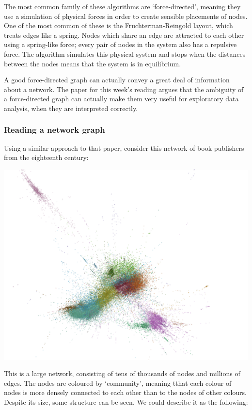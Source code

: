 \documentclass[
]{book}
\begin{document}
The most common family of these algorithms are `force-directed', meaning they use a simulation of physical forces in order to create sensible placements of nodes. One of the most common of these is the Fruchterman-Reingold layout, which treats edges like a spring. Nodes which share an edge are attracted to each other using a spring-like force; every pair of nodes in the system also has a repulsive force. The algorithm simulates this physical system and stops when the distances between the nodes means that the system is in equilibrium.

A good force-directed graph can actually convey a great deal of information about a network. The paper for this week's reading argues that the ambiguity of a force-directed graph can actually make them very useful for exploratory data analysis, when they are interpreted correctly.

\hypertarget{reading-a-network-graph}{%
\subsubsection{Reading a network graph}\label{reading-a-network-graph}}

Using a similar approach to that paper, consider this network of book publishers from the eighteenth century:

\includegraphics{images/full_net.png}

This is a large network, consisting of tens of thousands of nodes and millions of edges. The nodes are coloured by `community', meaning tthat each colour of nodes is more densely connected to each other than to the nodes of other colours. Despite its size, some structure can be seen. We could describe it as the following:
\end{document}
